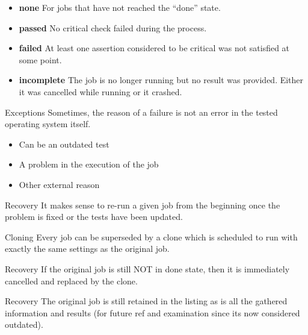 \documentclass{beamer}
\begin{document}
    \begin{frame}
        \begin{itemize}
            \item {\bf none} For jobs that have not reached the ``done'' state.
            \item {\bf passed} No critical check failed during the process.
            \item {\bf failed} At least one assertion considered to be critical was not satisfied at some point.
            \item {\bf incomplete} The job is no longer running but no result was provided. Either it was cancelled while running or it crashed.
        \end{itemize}
    \end{frame}

    \begin{frame}{Exceptions}
        Sometimes, the reason of a failure is not an error in the tested operating system itself.
        \begin{itemize}
            \item Can be an outdated test
            \item A problem in the execution of the job
            \item Other external reason
        \end{itemize}
    \end{frame}

    \begin{frame}{Recovery}
         It makes sense to re-run a given job from the beginning once the
         problem is fixed or the tests have been updated.

    \end{frame}

    \begin{frame}{Cloning}
         Every job can be superseded by a clone which is scheduled to run
         with exactly the same settings as the original job.
     \end{frame}

     \begin{frame}{Recovery}
         If the original job is still NOT in done state, then it is
         immediately cancelled and replaced by the clone.
     \end{frame}

     \begin{frame}{Recovery}
         The original job is still retained in the listing as is all the
         gathered information and results (for future ref and examination
         since its now considered outdated).
     \end{frame}
\end{document}
